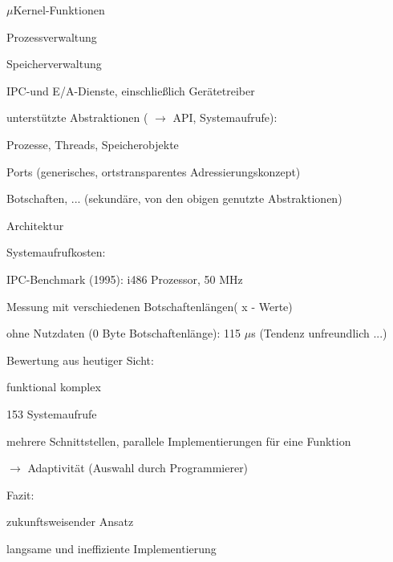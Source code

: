 \documentclass[a4paper]{article}
\begin{document}
\begin{multicols}{3}
    $\mu$Kernel-Funktionen
    \begin{enumerate*}
        \item Prozessverwaltung
        \item Speicherverwaltung
        \item IPC-und E/A-Dienste, einschließlich Gerätetreiber
    \end{enumerate*}

    unterstützte Abstraktionen ( $\rightarrow$ API, Systemaufrufe):
    \begin{enumerate*}
        \item Prozesse, Threads, Speicherobjekte
        \item Ports (generisches, ortstransparentes Adressierungskonzept)
        \item Botschaften, ... (sekundäre, von den obigen genutzte Abstraktionen)
    \end{enumerate*}

    Architektur
    \begin{itemize*}
        \item Systemaufrufkosten:
        \begin{itemize*}
            \item IPC-Benchmark (1995): i486 Prozessor, 50 MHz
            \item Messung mit verschiedenen Botschaftenlängen( x - Werte)
            \item ohne Nutzdaten (0 Byte Botschaftenlänge): 115 $\mu$s (Tendenz unfreundlich ...)
        \end{itemize*}
        \item Bewertung aus heutiger Sicht:
        \begin{itemize*}
            \item funktional komplex
            \item 153 Systemaufrufe
            \item mehrere Schnittstellen, parallele Implementierungen für eine Funktion
            \item[$\rightarrow$] Adaptivität (Auswahl durch Programmierer)
        \end{itemize*}
        \item Fazit:
        \begin{itemize*}
            \item zukunftsweisender Ansatz
            \item langsame und ineffiziente Implementierung
        \end{itemize*}
    \end{itemize*}


\end{multicols}
\end{document}
